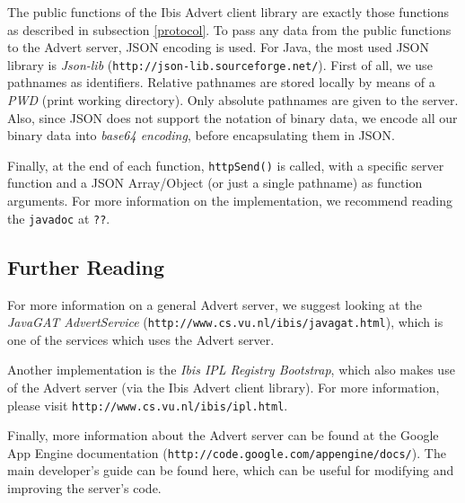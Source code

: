The public functions of the Ibis Advert client library are exactly those
functions as described in subsection \ref{protocol}. To pass any data from the
public functions to the Advert server, JSON encoding is used. For Java, the most
used JSON library is \emph{Json-lib} (\texttt{http://json-lib.sourceforge.net/}).
First of all, we use pathnames as identifiers. Relative pathnames are stored
locally by means of a \emph{PWD} (print working directory). Only absolute
pathnames are given to the server. Also, since JSON does not support the notation
of binary data, we encode all our binary data into \emph{base64 encoding}, before
encapsulating them in JSON.

Finally, at the end of each function, \texttt{httpSend()} is called, with a
specific server function and a JSON Array/Object (or just a single pathname) as
function arguments. For more information on the implementation, we recommend
reading the \texttt{javadoc} at \texttt{??}. %
 
\subsection{Further Reading}
\label{further}
For more information on a general Advert server, we suggest looking at the
\emph{JavaGAT AdvertService} (\texttt{http://www.cs.vu.nl/ibis/javagat.html}),
which is one of the services which uses the Advert server.

Another implementation is the \emph{Ibis IPL Registry Bootstrap}, which also
makes use of the Advert server (via the Ibis Advert client library). For more
information, please visit \texttt{http://www.cs.vu.nl/ibis/ipl.html}.

Finally, more information about the Advert server can be found at the Google
App Engine documentation (\texttt{http://code.google.com/appengine/docs/}). The
main developer's guide can be found here, which can be useful for modifying and
improving the server's code.
